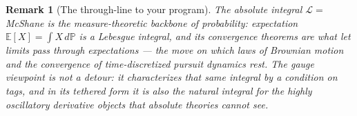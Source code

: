 \documentclass[11pt]{article}
\theoremstyle{atlas}
\newtheorem{remark}{Remark}
\newcommand{\Lint}{\mathcal{L}}
\begin{document}
\begin{remark}[The through-line to your program]
The absolute integral $\Lint=$ McShane is the measure-theoretic backbone of probability:
expectation $\mathbb E[X]=\int X\,d\mathbb P$ is a Lebesgue integral, and its convergence
theorems are what let limits pass through expectations --- the move on which laws of
Brownian motion and the convergence of time-discretized pursuit dynamics rest. The gauge
viewpoint is not a detour: it characterizes that same integral by a condition on
tags, and in its tethered form it is also the natural integral for the highly oscillatory
derivative objects that absolute theories cannot see.
\end{remark}
\end{document}
